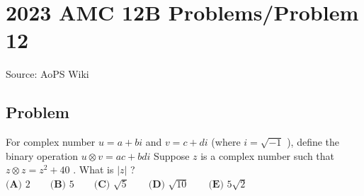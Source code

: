 \documentclass[12pt]{article}
\begin{document}
\section*{{2023 AMC 12B Problems/Problem 12}}
Source: AoPS Wiki

\subsection*{Problem}
For complex number $u = a+bi$ and $v = c+di$ (where $i=\sqrt{-1}$ ), define the binary operation $u \otimes v = ac + bdi$ Suppose $z$ is a complex number such that $z\otimes z = z^{2}+40$ . What is $|z|$ ? $\textbf{(A) }2\qquad\textbf{(B) }5\qquad\textbf{(C) }\sqrt{5}\qquad\textbf{(D) }\sqrt{10}\qquad\textbf{(E) }5\sqrt{2}$
\end{document}
